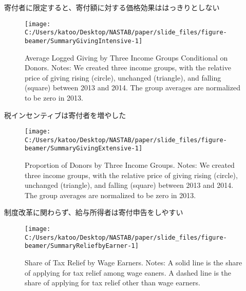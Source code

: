 \documentclass[
  ignorenonframetext,
  aspectratio=169,
]{beamer}
\begin{document}
\begin{frame}{寄付者に限定すると、寄付額に対する価格効果ははっきりとしない}
\protect\hypertarget{ux5bc4ux4ed8ux8005ux306bux9650ux5b9aux3059ux308bux3068ux5bc4ux4ed8ux984dux306bux5bfeux3059ux308bux4fa1ux683cux52b9ux679cux306fux306fux3063ux304dux308aux3068ux3057ux306aux3044}{}
\begin{figure}[t]

{\centering \texttt{[image: C:/Users/katoo/Desktop/NASTAB/paper/slide\_files/figure-beamer/SummaryGivingIntensive-1]} 

}

\caption{Average Logged Giving by Three Income Groups Conditional on Donors. Notes: We created three income groups, with the relative price of giving rising (circle), unchanged (triangle), and falling (square) between 2013 and 2014. The group averages are normalized to be zero in 2013.}\label{fig:SummaryGivingIntensive}
\end{figure}
\end{frame}

\begin{frame}{税インセンティブは寄付者を増やした}
\protect\hypertarget{ux7a0eux30a4ux30f3ux30bbux30f3ux30c6ux30a3ux30d6ux306fux5bc4ux4ed8ux8005ux3092ux5897ux3084ux3057ux305f}{}
\begin{figure}[t]

{\centering \texttt{[image: C:/Users/katoo/Desktop/NASTAB/paper/slide\_files/figure-beamer/SummaryGivingExtensive-1]} 

}

\caption{Proportion of Donors by Three Income Groups. Notes: We created three income groups, with the relative price of giving rising (circle), unchanged (triangle), and falling (square) between 2013 and 2014. The group averages are normalized to be zero in 2013.}\label{fig:SummaryGivingExtensive}
\end{figure}
\end{frame}

\begin{frame}{制度改革に関わらず、給与所得者は寄付申告をしやすい}
\protect\hypertarget{ux5236ux5ea6ux6539ux9769ux306bux95a2ux308fux3089ux305aux7d66ux4e0eux6240ux5f97ux8005ux306fux5bc4ux4ed8ux7533ux544aux3092ux3057ux3084ux3059ux3044}{}
\begin{figure}[t]

{\centering \texttt{[image: C:/Users/katoo/Desktop/NASTAB/paper/slide\_files/figure-beamer/SummaryReliefbyEarner-1]} 

}

\caption{Share of Tax Relief by Wage Earners. Notes: A solid line is the share of applying for tax relief among wage eaners. A dashed line is the share of applying for tax relief other than wage earners.}\label{fig:SummaryReliefbyEarner}
\end{figure}
\end{frame}
\end{document}
